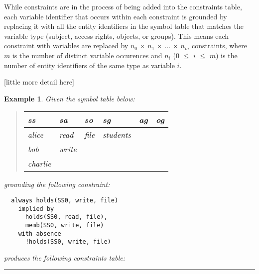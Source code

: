 \documentclass[10pt, twocolumn]{article}
\newtheorem{examp}{Example}
\newenvironment{example}{\begin{examp}\rm}{\rule{2mm}{2mm}\end{examp}}
\begin{document}
        While constraints are in the process of being added into the
        constraints table, each variable identifier that occurs within each
        constraint is grounded by replacing it with all the entity identifiers
        in the symbol table that matches the variable type (subject, access
        rights, objects, or groups). This means each constraint with variables
        are replaced by $n_0$ $\times$ $n_1$ $\times$ $\hdots$ $\times$ $n_m$
        constraints, where $m$ is the number of distinct variable occurences
        and $n_i$ ($0$ $\leq$ $i$ $\leq$ $m$) is the number of entity
        identifiers of the same type as variable $i$.

        [little more detail here]

        \begin{example}
          Given the symbol table below:

          \begin{quote}
            \begin{tabular}[t]{|l|l|l|l|l|l|}
              \hline
              \textbf{ss} & \textbf{sa} & \textbf{so} & \textbf{sg} & \textbf{ag} & \textbf{og} \\
              \hline
              alice & read & file & students & & \\
              bob & write & & & & \\
              charlie & & & & & \\
              \hline
            \end{tabular}
          \end{quote}

          grounding the following constraint:

          \begin{verbatim}
  always holds(SS0, write, file)
    implied by
      holds(SS0, read, file),
      memb(SS0, write, file)
    with absence
      !holds(SS0, write, file)
          \end{verbatim}

          produces the following constraints table:


\end{example}
\end{document}
